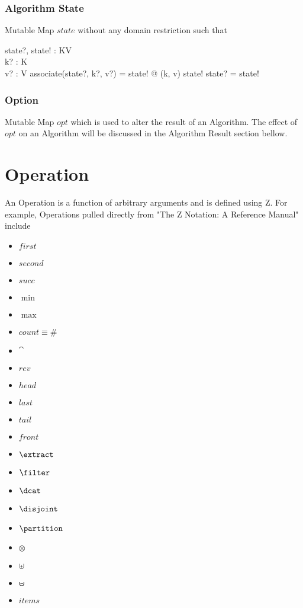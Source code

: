 \documentclass[../main.tex]{subfiles}
\begin{document}
\subsubsection{Algorithm State}

Mutable Map $state$ without any domain restriction such that
\begin{axdef}
  state?, state! : KV \\
  k? : K \\
  v? : V
  \where
  associate(state?, k?, v?) = state! @ (k, v) \in state! \implies state? \not= state!
\end{axdef}

\subsubsection{Option}

Mutable Map $opt$ which is used to alter the result of an Algorithm. The effect of $opt$ on an Algorithm will be discussed in the Algorithm Result section bellow.

\section{Operation}

An Operation is a function of arbitrary arguments and is defined using Z. For example, Operations pulled directly from "The Z Notation: A Reference Manual" include
\begin{itemize}
\item $first$
\item $second$
\item $succ$
\item $\min$
\item $\max$
\item $count \equiv \#$
\item $\cat$
\item $rev$
\item $head$
\item $last$
\item $tail$
\item $front$
\item $\extract$
\item $\filter$
\item $\dcat$
\item $\disjoint$
\item $\partition$
\item $\otimes$
\item $\uplus$
\item $\uminus$
\item $items$
\end{itemize}
\end{document}
